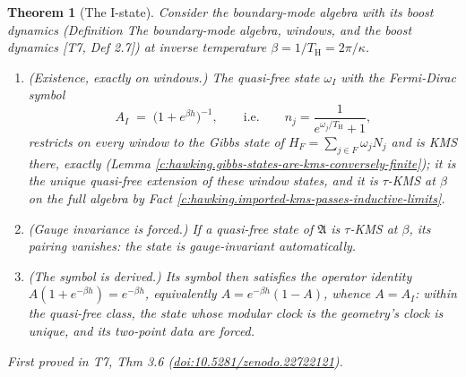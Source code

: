 \documentclass[11pt]{article}
\newtheorem{theorem}{Theorem}[section]
\theoremstyle{definition}
\theoremstyle{plain}
\providecommand{\TH}{}\renewcommand{\TH}{T_{\mathrm{H}}}
\begin{document}
\begin{theorem}[The I-state]\label{c:hawking.i-state}
Consider the boundary-mode algebra with its boost dynamics (Definition \emph{The boundary-mode algebra, windows, and the boost dynamics} [T7, Def 2.7]) at inverse temperature $\beta = 1/\TH = 2\pi/\kappa$.
\begin{enumerate}
\item \emph{(Existence, exactly on windows.)} The quasi-free state $\omega_I$ with the Fermi-Dirac symbol
\[
A_I \;=\; \bigl(1 + e^{\beta h}\bigr)^{-1}, \qquad\text{i.e.}\qquad n_j = \frac{1}{e^{\omega_j/\TH} + 1},
\]
restricts on every window to the Gibbs state of $H_F = \sum_{j \in F}\omega_j N_j$ and is KMS there, exactly (Lemma \ref{c:hawking.gibbs-states-are-kms-conversely-finite}); it is the unique quasi-free extension of these window states, and it is $\tau$-KMS at $\beta$ on the full algebra by Fact \ref{c:hawking.imported-kms-passes-inductive-limits}.
\item \emph{(Gauge invariance is forced.)} If a quasi-free state of $\mathfrak{A}$ is $\tau$-KMS at $\beta$, its pairing vanishes: the state is gauge-invariant automatically.
\item \emph{(The symbol is derived.)} Its symbol then satisfies the operator identity $A(1 + e^{-\beta h}) = e^{-\beta h}$, equivalently $A = e^{-\beta h}(1 - A)$, whence $A = A_I$: within the quasi-free class, the state whose modular clock is the geometry's clock is unique, and its two-point data are forced.
\end{enumerate}
\emph{First proved in} T7, Thm 3.6 (\href{https://doi.org/10.5281/zenodo.22722121}{doi:10.5281/zenodo.22722121}).
\end{theorem}
\end{document}
